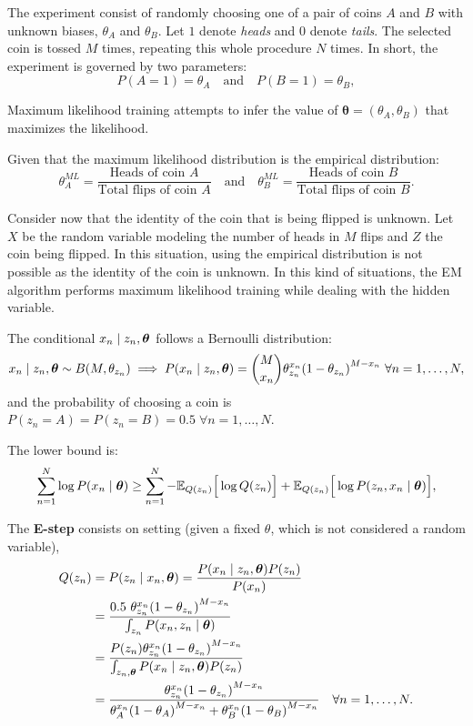 The experiment consist of randomly choosing one of a pair of coins \(A\) and \(B\) with unknown biases, \(\theta_{A}\)  and \(\theta_{B}\). Let \(1\) denote \textit{heads} and \(0\) denote \textit{tails}. The selected coin is tossed \(M\)  times, repeating this whole procedure \(N\)  times. In short, the experiment is governed by two parameters:
\[
  P(A = 1) = \theta_{A} \quad \text{and} \quad P(B = 1) = \theta_{B},
\]

Maximum likelihood training attempts to infer the value of \(\bm{\theta} = (\theta_{A}, \theta_{B})\) that maximizes the likelihood.

Given that the maximum likelihood distribution is the empirical distribution:
\[
  \theta_{A}^{ML} = \frac{\text{Heads of coin }A}{\text{Total flips of coin }A} \quad \text{and} \quad \theta_{B}^{ML} = \frac{\text{Heads of coin }B}{\text{Total flips of coin }B}.
\]

Consider now that the identity of the coin that is being flipped is unknown. Let \(X\) be the random variable modeling the number of heads in \(M\) flips and \(Z\) the coin being flipped. In this situation, using the empirical distribution is not possible as the identity of the coin is unknown. In this kind of situations, the EM algorithm performs maximum likelihood training while dealing with the hidden variable.


The conditional \(x_{n} \mid z_{n}, \bm{\theta}\) follows a Bernoulli distribution:
\[
  x_{n} \mid z_{n}, \btheta \sim B(M, \theta_{z_{n}}) \implies P(x_{n} \mid z_{n}, \btheta) = \binom{M}{x_{n}}\theta_{z_{n}}^{x_{n}}{(1-\theta_{z_{n}})}^{M - x_{n}} \ \forall n =1,\dots,N,
\]
and the probability of choosing a coin is \(P(z_{n}=A) = P(z_{n}=B)=0.5 \; \forall n =1,\dots,N\).

The lower bound is:
\[
  \sum_{n=1}^{N}\log{P(x_{n} \mid \bm{\theta})} \geq \sum_{n=1}^{N}-\mathbb{E}_{Q(z_{n})}\Big[\log{Q(z_{n})}\Big] + \mathbb{E}_{Q(z_{n})}\Big[\log{P(z_{n}, x_{n} \mid \bm{\theta})}\Big],
\]

The \textbf{E-step} consists on setting (given a fixed \(\theta\), which is not considered a random variable),
\[
  \begin{aligned}
    Q(z_{n}) &= P(z_{n} \mid x_{n}, \bm{\theta}) = \frac{P(x_{n} \mid z_{n}, \bm{\theta})P(z_{n})}{P(x_{n})} \\
    &= \frac{0.5\ \theta_{z_{n}}^{x_{n}}{(1-\theta_{z_{n}})}^{M - x_{n}}}{\int_{z_{n}}P(x_{n},z_{n}\mid \bm{\theta})}\\
    &= \frac{P(z_{n})\theta_{z_{n}}^{x_{n}}{(1-\theta_{z_{n}})}^{M - x_{n}}}{\int_{z_{n}, \bm{\theta}}P(x_{n}\mid z_{n}, \bm{\theta})P(z_{n})}\\
    &= \frac{\theta_{z_{n}}^{x_{n}}{(1-\theta_{z_{n}})}^{M - x_{n}}}{  \theta_{A}^{x_{n}}{(1-\theta_{A})}^{M - x_{n}} + \theta_{B}^{x_{n}}{(1-\theta_{B})}^{M - x_{n}}} \quad \forall n=1,\dots,N.
  \end{aligned}
\]

